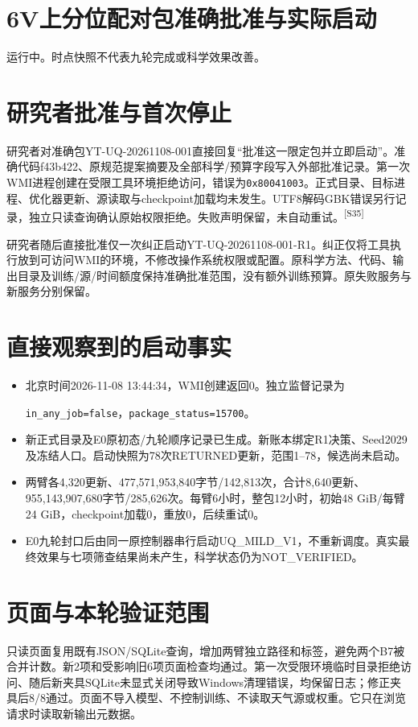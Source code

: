 \documentclass[UTF8,10.5pt,a4paper,fontset=none]{ctexart}
\newcommand{\evi}[1]{\textsuperscript{\color{muted}[#1]}}
\newcommand{\pageheading}[2]{\clearpage\section*{#1}\textcolor{muted}{#2}\par\vspace{3pt}}
\begin{document}
\pageheading{6V\quad 上分位配对包准确批准与实际启动}{运行中。时点快照不代表九轮完成或科学效果改善。}
\section*{研究者批准与首次停止}
研究者对准确包YT-UQ-20261108-001直接回复“批准这一限定包并立即启动”。准确代码f43b422、原规范提案摘要及全部科学/预算字段写入外部批准记录。第一次WMI进程创建在受限工具环境拒绝访问，错误为\texttt{0x80041003}。正式目录、目标进程、优化器更新、源读取与checkpoint加载均未发生。UTF8解码GBK错误另行记录，独立只读查询确认原始权限拒绝。失败声明保留，未自动重试。\evi{S35}

研究者随后直接批准仅一次纠正启动YT-UQ-20261108-001-R1。纠正仅将工具执行放到可访问WMI的环境，不修改操作系统权限或配置。原科学方法、代码、输出目录及训练/源/时间额度保持准确批准范围，没有额外训练预算。原失败服务与新服务分别保留。

\section*{直接观察到的启动事实}
\begin{itemize}
\item 北京时间2026-11-08 13:44:34，WMI创建返回0。独立监督记录为\par\texttt{in\_any\_job=false}，\texttt{package\_status=15700}。
\item 新正式目录及E0原初态/九轮顺序记录已生成。新账本绑定R1决策、Seed2029及冻结人口。启动快照为78次RETURNED更新，范围1--78，候选尚未启动。
\item 两臂各4,320更新、477,571,953,840字节/142,813次，合计8,640更新、955,143,907,680字节/285,626次。每臂6小时，整包12小时，初始48 GiB/每臂24 GiB，checkpoint加载0，重放0，后续重试0。
\item E0九轮封口后由同一原控制器串行启动UQ\_MILD\_V1，不重新调度。真实最终效果与七项筛查结果尚未产生，科学状态仍为NOT\_VERIFIED。
\end{itemize}

\section*{页面与本轮验证范围}
只读页面复用既有JSON/SQLite查询，增加两臂独立路径和标签，避免两个B7被合并计数。新2项和受影响旧6项页面检查均通过。第一次受限环境临时目录拒绝访问、随后新夹具SQLite未显式关闭导致Windows清理错误，均保留日志；修正夹具后8/8通过。页面不导入模型、不控制训练、不读取天气源或权重。它只在浏览请求时读取新输出元数据。
\end{document}
